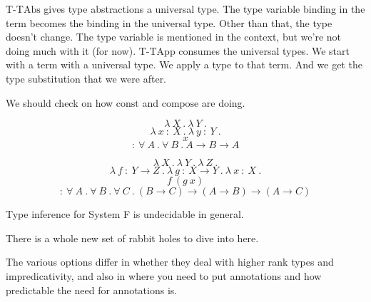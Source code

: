 \begin{frame}
\begin{mdframed}[frametitle={Typing rules (new)}]
\begin{overprint}
  \end{overprint}

  \end{mdframed}

  \medskip

  \begin{overprint}
    $\text{T-TAbs}$ gives type abstractions a universal type.
    The type variable binding in the term becomes the binding in the universal type.
    Other than that, the type doesn't change.
    The type variable is mentioned in the context, but we're not doing much with
    it (for now).
    $\text{T-TApp}$ consumes the universal types.
    We start with a term with a universal type.
    We apply a type to that term.
    And we get the type substitution that we were after.
  \end{overprint}
\end{frame}

\begin{frame}
  We should check on how $\text{const}$ and $\text{compose}$ are doing.
\end{frame}

\begin{frame}
  \[\lambda~X~.~\lambda~Y~.\]
  \[\lambda~x~{:}~X~.~\lambda~y~{:}~Y~.\]
  \[x\]
  \[{:}~\forall~A~.~\forall~B~.~A \rightarrow B \rightarrow A\]
\end{frame}

\begin{frame}
    \[\lambda~X~.~\lambda~Y~.~\lambda~Z~.\]
    \[\lambda~f~{:}~Y \rightarrow Z~.~\lambda~g~{:}~X \rightarrow Y~.~\lambda~x~{:}~X~.\]
    \[f~\left( g~x \right)\]
    \[{:}~\forall~A~.~\forall~B~.~\forall~C~.~\left( B \rightarrow C \right) \rightarrow \left( A \rightarrow B \right) \rightarrow \left( A \rightarrow C \right)\]
\end{frame}

\begin{frame}
  Type inference for System F is undecidable in general.
\end{frame}

\begin{frame}
  There is a whole new set of rabbit holes to dive into here.
\end{frame}

\begin{frame}
  The various options differ in whether they deal with higher rank types and
  impredicativity, and also in where you need to put annotations and how
  predictable the need for annotations is.
\end{frame}

